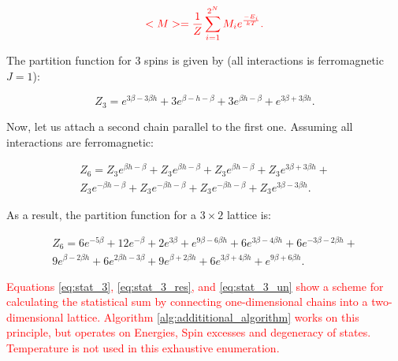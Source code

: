 \documentclass[preprint,12pt]{elsarticle}
\begin{document}
	\begin{equation}
		\color{red}
		<M> = \frac{1}{Z} \sum_{i = 1}^{2^N} M_i e^{\frac{-E_i}{kT}}.
		\label{magnetisation}
	\end{equation}
	
	The partition function for 3 spins is given by (all interactions is ferromagnetic $J = 1$):
	
	\begin{equation}
		Z_3 = e^{3\beta - 3\beta h} + 3e^{\beta - h - \beta} + 3e^{\beta h - \beta} + e^{3\beta + 3\beta h}.
		\label{eq:stat_3}
	\end{equation}
	
	Now, let us attach a second chain parallel to the first one. Assuming all interactions are ferromagnetic:
	
	\begin{equation}
		\label{eq:stat_3_un}
		\begin{alignedat}{2}
			Z_6 = Z_3 e^{\beta h-\beta} + Z_3 e^{\beta h-\beta} + Z_3 e^{\beta h-\beta} + Z_3 e^{3 \beta +3 \beta h} + \\
			Z_3 e^{-\beta h-\beta} + Z_3 e^{-\beta h-\beta} + Z_3 e^{-\beta h-\beta} + Z_3 e^{3 \beta -3 \beta h}.
		\end{alignedat}
	\end{equation}
	
	As a result, the partition function for a $3 \times 2$ lattice is:
	
	\begin{equation}
		\label{eq:stat_3_res}
		\begin{alignedat}{2}
			Z_6 = 6 e^{-5 \beta } + 12 e^{-\beta } + 2 e^{3 \beta } + e^{9 \beta -6 \beta  h} + 6 e^{3 \beta -4 \beta  h} + 6 e^{-3 \beta -2 \beta  h} + \\
			9 e^{\beta -2 \beta  h} + 6 e^{2 \beta  h-3 \beta } + 9 e^{\beta +2 \beta  h} + 6 e^{3 \beta +4 \beta  h} + e^{9 \beta +6 \beta  h}.
		\end{alignedat}
	\end{equation}
	
	\textcolor{red}{Equations \eqref{eq:stat_3}, \eqref{eq:stat_3_res}, and \eqref{eq:stat_3_un} show a scheme for calculating the statistical sum by connecting one-dimensional chains into a two-dimensional lattice. Algorithm \ref{alg:addititional_algorithm} \cite{trukhin2024glaurung} works on this principle, but operates on Energies, Spin excesses and degeneracy of states. Temperature is not used in this exhaustive enumeration.}
	
\end{document}
